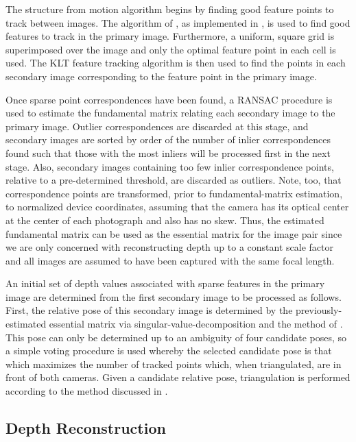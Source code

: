 \documentclass[conference]{acmsiggraph}
\begin{document}
The structure from motion algorithm begins by finding good feature points
to track between images.  The algorithm of \cite{shi1994good}, as implemented
in \cite{opencv_library}, is used to find good features to track in the
primary image.
Furthermore, a uniform, square grid is superimposed over the image and only
the optimal feature point in each cell is used.
The KLT feature tracking algorithm is then used to find the points in each
secondary image corresponding to the feature point in the primary image.

Once sparse point correspondences have been found, a RANSAC procedure
is used to estimate the fundamental matrix relating each secondary
image to the primary image.  Outlier correspondences are discarded at this
stage, and secondary images are sorted by order of the number of inlier
correspondences found such that those with the most inliers will
be processed first in the next stage.  Also, secondary images containing
too few inlier correspondence points, relative to a pre-determined
threshold, are discarded as outliers.  Note, too, that correspondence
points are transformed, prior to fundamental-matrix estimation, to normalized
device coordinates, assuming that the camera has its optical center at the center of each
photograph and also has no skew.  Thus, the estimated fundamental matrix
can be used as the essential matrix for the image pair since
we are only concerned with reconstructing depth up to a constant scale
factor and all images are assumed to have been captured with the
same focal length.

An initial set of depth values associated with sparse features in
the primary image are determined from the first secondary image
to be processed as follows.  First, the relative pose of this secondary
image is determined by the previously-estimated essential matrix via
singular-value-decomposition and the method of \cite{hartley2003multiple}.
This pose can only be determined up to an ambiguity of four candidate poses,
so a simple voting procedure is used whereby the selected candidate pose is
that which maximizes the number of tracked points which, when triangulated,
are in front of both cameras.  Given a candidate relative pose, triangulation
is performed according to the method discussed in \cite{hartley1997triangulation}.

\subsection{Depth Reconstruction}
\end{document}
